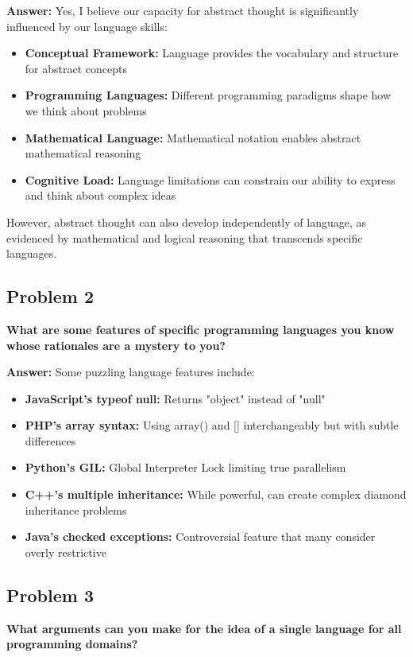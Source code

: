\documentclass[11pt,a4paper]{article}
\begin{document}
\textbf{Answer:}
Yes, I believe our capacity for abstract thought is significantly influenced by our language skills:

\begin{itemize}
\item \textbf{Conceptual Framework:} Language provides the vocabulary and structure for abstract concepts
\item \textbf{Programming Languages:} Different programming paradigms shape how we think about problems
\item \textbf{Mathematical Language:} Mathematical notation enables abstract mathematical reasoning
\item \textbf{Cognitive Load:} Language limitations can constrain our ability to express and think about complex ideas
\end{itemize}

However, abstract thought can also develop independently of language, as evidenced by mathematical and logical reasoning that transcends specific languages.

\subsection{Problem 2}
\textbf{What are some features of specific programming languages you know whose rationales are a mystery to you?}

\textbf{Answer:}
Some puzzling language features include:

\begin{itemize}
\item \textbf{JavaScript's typeof null:} Returns "object" instead of "null"
\item \textbf{PHP's array syntax:} Using array() and [] interchangeably but with subtle differences
\item \textbf{Python's GIL:} Global Interpreter Lock limiting true parallelism
\item \textbf{C++'s multiple inheritance:} While powerful, can create complex diamond inheritance problems
\item \textbf{Java's checked exceptions:} Controversial feature that many consider overly restrictive
\end{itemize}

\subsection{Problem 3}
\textbf{What arguments can you make for the idea of a single language for all programming domains?}
\end{document}
